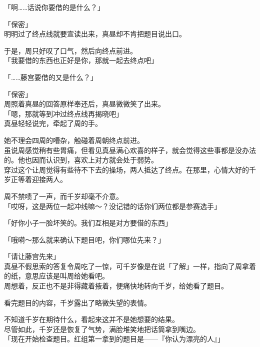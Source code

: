 「啊……话说你要借的是什么？」

「保密」\\

明明过了终点线就要宣读出来，真昼却不肯把题目说出口。

于是，周只好叹了口气，然后向终点前进。\\

「我要借的东西也正好是你，那就一起去终点吧」

「……藤宫要借的又是什么？」

「保密」\\

周照着真昼的回答原样奉还后，真昼微微笑了出来。\\

「嗯，那就等到冲过终点线再揭晓吧」\\

真昼轻轻说完，牵起了周的手。

她不理会四周的嘈杂，触碰着周朝终点前进。\\

虽说周感觉稍有些胃痛，但看见真昼满心欢喜的样子，就会觉得这些事都是没办法的。他也因而认识到，喜欢上对方就会处于弱势。\\

穿过这个让周觉得有些待不下去的操场，两人抵达了终点。在那里，心情大好的千岁正等着迎接两人。

周不禁啧了一声，而千岁却毫不介意。\\

「哎呀，这是两位一起冲线嘛～？没记错的话你们两位都是参赛选手」

「好你小子一脸坏笑的。我们互相是对方要借的东西」

「哦嗬～那么就来确认下题目吧，你们哪位先来？」

「请让藤宫先来」\\

真昼不假思索的答复令周吃了一惊，可千岁像是在说「了解」一样，指向了周拿着的纸，意思应该是叫周给她看吧。\\

周想着，反正也不是非得藏着掖着，便痛快地转向千岁，给她看了题目。

看完题目的内容，千岁露出了略微失望的表情。

不知道千岁在期待什么，看起来这并不是她想要的结果。\\

尽管如此，千岁还是恢复了气势，满脸堆笑地把话筒拿到嘴边。\\

「现在开始检查题目。红组第一拿到的题目是——『你认为漂亮的人』」\\

